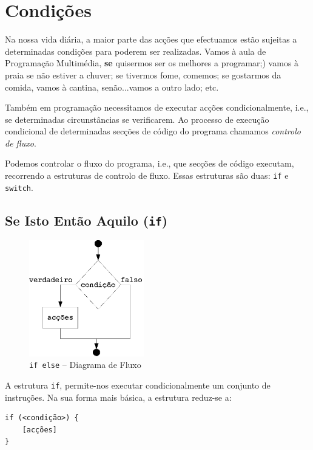 \chapter{Condições}\label{cap:seleccao}

Na nossa vida diária, a maior parte das acções que efectuamos estão sujeitas a determinadas condições para poderem ser realizadas. Vamos à aula de Programação Multimédia,  \textbf{se} quisermos ser os melhores a programar;) vamos à praia se não estiver a chuver; se tivermos fome, comemos; se gostarmos da comida, vamos à cantina, senão...vamos a outro lado; etc.

Também em programação necessitamos de executar acções condicionalmente, i.e., se determinadas circunstâncias se verificarem. 
Ao processo de execução condicional de determinadas secções de código do programa chamamos \emph{controlo de fluxo}.

Podemos controlar o fluxo do programa, i.e., que secções de código executam, recorrendo a estruturas de controlo
de fluxo. Essas estruturas são duas: \texttt{if} e \texttt{switch}.


\section{Se Isto Então Aquilo (\texttt{if})}
\begin{figure}[!ht]
	\centering
		\includegraphics[width=5cm]{images/se-entao.eps}
	\caption{\texttt{if else} -- Diagrama de Fluxo}
	\label{fig:se-entao}
\end{figure}
A estrutura \texttt{if}, permite-nos executar condicionalmente um conjunto de instruções.
Na sua forma mais básica, a estrutura reduz-se a:
\begin{lstlisting}
if (<condição>) {
    [acções]
}
\end{lstlisting}

